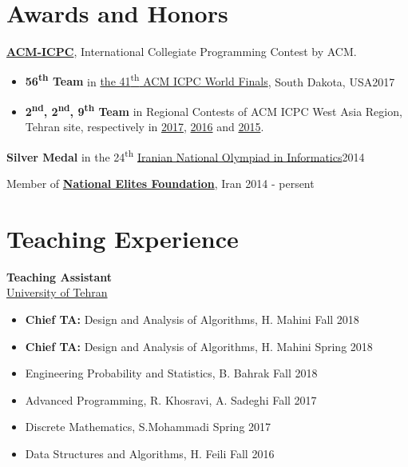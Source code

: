 \documentclass[margin]{res}
\begin{document}
\begin{resume}
\section{Awards and Honors}
	{\bf \href{http://icpc.baylor.edu/}{ACM-ICPC}}, International Collegiate Programming Contest by ACM.
	\vspace{2mm}
	\begin{itemize}
		\item {\bf 56\textsuperscript{th} Team} in
		\href{https://icpc.baylor.edu/community/results-2017}{the 41\textsuperscript{th} ACM ICPC World Finals},
		South Dakota, USA\hfill 2017

		\item {\bf 2\textsuperscript{nd}, 2\textsuperscript{nd}, 9\textsuperscript{th} Team} in Regional Contests of ACM ICPC West Asia Region,
		Tehran site, respectively in
		\href{http://icpc.sharif.edu/acmicpc17/scoreboard/}{2017},
		\href{http://icpc.sharif.edu/acmicpc16/scoreboard/}{2016} and
		\href{http://icpc.sharif.edu/acmicpc15/scoreboard/}{2015}.
    \end{itemize}

    {\bf Silver Medal} in the 24\textsuperscript{th} \href{http://inoi.ir/}{Iranian National Olympiad in Informatics}\hfill 2014

    Member of \href{https://www.bmn.ir/}{{\bf National Elites Foundation}}, Iran \hfill 2014 - persent

\section{Teaching Experience}
	{\bf Teaching Assistant}
	\\\href{http://ut.ac.ir/en}{University of Tehran}
	\begin{itemize}
		\item {\bf Chief TA:} Design and Analysis of Algorithms, H. Mahini \hfill Fall 2018
		\item {\bf Chief TA:} Design and Analysis of Algorithms, H. Mahini \hfill Spring 2018
		\item Engineering Probability and Statistics, B. Bahrak \hfill Fall 2018
		\item Advanced Programming, R. Khosravi, A. Sadeghi \hfill Fall 2017
		\item Discrete Mathematics, S.Mohammadi \hfill Spring 2017
		\item Data Structures and Algorithms, H. Feili \hfill Fall 2016
	\end{itemize}


\end{resume}
\end{document}
